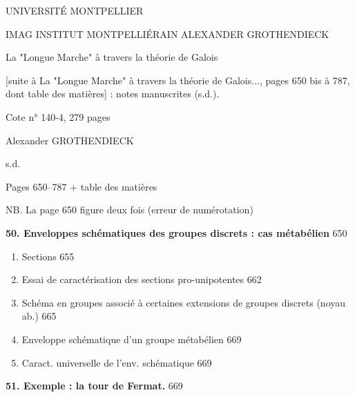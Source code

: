 

UNIVERSITÉ MONTPELLIER

IMAG
INSTITUT MONTPELLIÉRAIN
ALEXANDER GROTHENDIECK

La "Longue Marche" à travers la théorie de Galois

[suite à La "Longue Marche" à travers la théorie de Galois..., pages 650 bis à 787, dont
table des matières] : notes manuscrites (s.d.).

Cote n° 140-4, 279 pages

Alexander GROTHENDIECK

s.d.

\newpage


Pages 650--787 + table des matières

NB. La page 650 figure deux fois (erreur de numérotation)

\newpage


\noindent \textbf{50. Enveloppes schématiques des groupes discrets : cas métabélien} \hfill 650

\begin{enumerate}
\item[1)] Sections \hfill 655
\item[2)] Essai de caractérisation des sections pro-unipotentes \hfill 662
\item[3)] Schéma en groupes associé à certaines extensions de groupes discrets (noyau ab.) \hfill 665
\item[4)] Enveloppe schématique d'un groupe métabélien \hfill 669
\item[5)] Caract. universelle de l'env. schématique \hfill 669
\end{enumerate}

\vspace{1em}
\noindent \textbf{51. Exemple : la tour de Fermat.} \hfill 669

